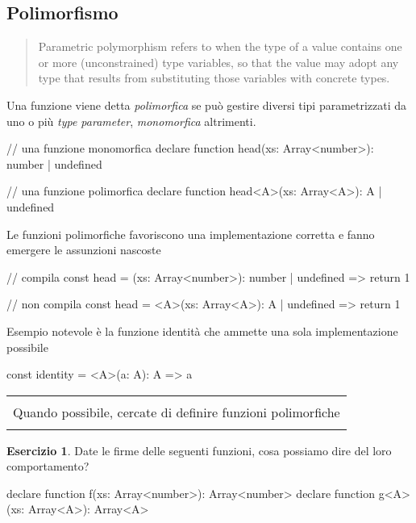 \documentclass[12pt]{article}
\theoremstyle{definition}
\newtheorem{exercise}{Esercizio}[subsection]
\newenvironment{boxed}
    {\begin{center}
    \begin{tabular}{|p{0.9\textwidth}|}
    \hline\\
    }
    {
    \\\\\hline
    \end{tabular}
    \end{center}
    }
\newenvironment{code}
  {\vspace{0.5cm} \VerbatimEnvironment\begin{typescriptcode}}
  {\end{typescriptcode} \vspace{0.2cm}}
\begin{document}
\subsection{Polimorfismo}

\begin{quote}
Parametric polymorphism refers to when the type of a value contains one or more (unconstrained) type variables,
so that the value may adopt any type that results from substituting those variables with concrete types.
\end{quote}

Una funzione viene detta \emph{polimorfica} se può gestire diversi tipi parametrizzati da uno o più \emph{type parameter},
\emph{monomorfica} altrimenti.

\begin{code}
// una funzione monomorfica
declare function head(xs: Array<number>): number | undefined

// una funzione polimorfica
declare function head<A>(xs: Array<A>): A | undefined
\end{code}

Le funzioni polimorfiche favoriscono una implementazione corretta e fanno emergere le assunzioni nascoste

\begin{code}
// compila
const head = (xs: Array<number>): number | undefined => {
  return 1
}

// non compila
const head = <A>(xs: Array<A>): A | undefined => {
  return 1
}
\end{code}

Esempio notevole è la funzione identità che ammette una sola implementazione possibile

\begin{code}
const identity = <A>(a: A): A => a
\end{code}

\begin{boxed}
Quando possibile, cercate di definire funzioni polimorfiche
\end{boxed}

\begin{exercise}
Date le firme delle seguenti funzioni, cosa possiamo dire del loro comportamento?

\begin{code}
declare function f(xs: Array<number>): Array<number>
declare function g<A>(xs: Array<A>): Array<A>
\end{code}
\end{exercise}
\end{document}
